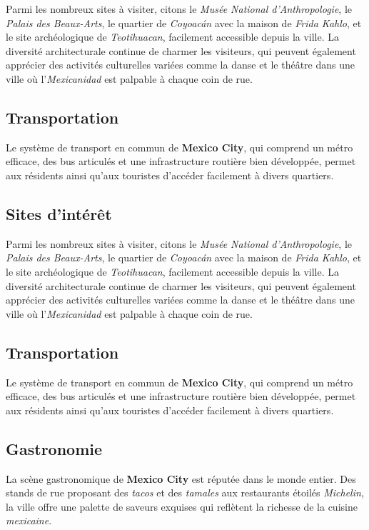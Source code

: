 \documentclass[12pt, a4paper]{article}
\begin{document}
Parmi les nombreux sites à visiter, citons le \textit{Musée National d'Anthropologie}, le \textit{Palais des Beaux-Arts}, le quartier de \textit{Coyoacán} avec la maison de \textit{Frida Kahlo}, et le site archéologique de \textit{Teotihuacan}, facilement accessible depuis la ville.
La diversité architecturale continue de charmer les visiteurs, qui peuvent également apprécier des activités culturelles variées comme la danse et le théâtre dans une ville où l'\textit{Mexicanidad} est palpable à chaque coin de rue. \subsection*{\textbf{Transportation}} Le système de transport en commun de \textbf{Mexico City}, qui comprend un métro efficace, des bus articulés et une infrastructure routière bien développée, permet aux résidents ainsi qu'aux touristes d'accéder facilement à divers quartiers.

\subsection*{\textbf{Sites d'intérêt}}

Parmi les nombreux sites à visiter, citons le \textit{Musée National d'Anthropologie}, le \textit{Palais des Beaux-Arts}, le quartier de \textit{Coyoacán} avec la maison de \textit{Frida Kahlo}, et le site archéologique de \textit{Teotihuacan}, facilement accessible depuis la ville.
La diversité architecturale continue de charmer les visiteurs, qui peuvent également apprécier des activités culturelles variées comme la danse et le théâtre dans une ville où l'\textit{Mexicanidad} est palpable à chaque coin de rue. \subsection*{\textbf{Transportation}} Le système de transport en commun de \textbf{Mexico City}, qui comprend un métro efficace, des bus articulés et une infrastructure routière bien développée, permet aux résidents ainsi qu'aux touristes d'accéder facilement à divers quartiers.

\subsection*{\textbf{Gastronomie}}

La scène gastronomique de \textbf{Mexico City} est réputée dans le monde entier. Des stands de rue proposant des \textit{tacos} et des \textit{tamales} aux restaurants étoilés \textit{Michelin}, la ville offre une palette de saveurs exquises qui reflètent la richesse de la cuisine \textit{mexicaine}.
\end{document}
